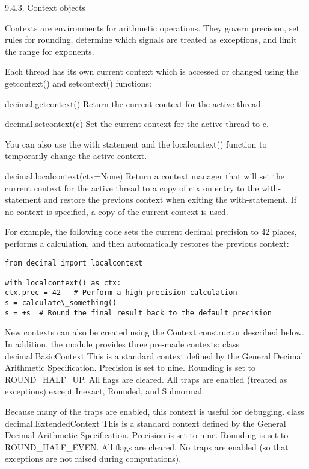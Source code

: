 9.4.3. Context objects

Contexts are environments for arithmetic operations. They govern precision, set rules for rounding, determine which signals are treated as exceptions, and limit the range for exponents.

Each thread has its own current context which is accessed or changed using the getcontext() and setcontext() functions:

decimal.getcontext()
Return the current context for the active thread.

decimal.setcontext(c)
Set the current context for the active thread to c.

You can also use the with statement and the localcontext() function to temporarily change the active context.

decimal.localcontext(ctx=None)
Return a context manager that will set the current context for the active thread to a copy of ctx on entry to the with-statement and restore the previous context when exiting the with-statement. If no context is specified, a copy of the current context is used.

For example, the following code sets the current decimal precision to 42 places, performs a calculation, and then automatically restores the previous context:

\begin{lstlisting}
from decimal import localcontext

with localcontext() as ctx:
ctx.prec = 42   # Perform a high precision calculation
s = calculate\_something()
s = +s  # Round the final result back to the default precision
\end{lstlisting}

New contexts can also be created using the Context constructor described below. In addition, the module provides three pre-made contexts:
class decimal.BasicContext
This is a standard context defined by the General Decimal Arithmetic Specification. Precision is set to nine. Rounding is set to ROUND\_HALF\_UP. All flags are cleared. All traps are enabled (treated as exceptions) except Inexact, Rounded, and Subnormal.

Because many of the traps are enabled, this context is useful for debugging.
class decimal.ExtendedContext
This is a standard context defined by the General Decimal Arithmetic Specification. Precision is set to nine. Rounding is set to ROUND\_HALF\_EVEN. All flags are cleared. No traps are enabled (so that exceptions are not raised during computations).

